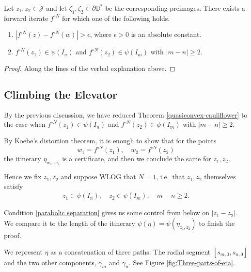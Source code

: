 \begin{theorem}
	Let $z_1,z_2 \in \mathcal J$ and let $\zeta_1,\zeta_2\in \partial \mathbb D^*$ be the corresponding preimages. 
	 There exists a forward iterate	$f^{\circ N}$ for which one of the following holds.
	\begin{enumerate}[label=(\roman*)]
		\item $\left|f^{\circ N}(z)-f^{\circ N}(w)\right|>\epsilon$, where $\epsilon>0$ is an absolute constant.
		
		\item $f^{\circ N }(z_1) \in \psi(I_n)$ and $f^{\circ N }(z_2) \in \psi(I_m)$ with $|m-n| \geq 2$.
	\end{enumerate}
	
\end{theorem}

\begin{proof}
	Along the lines of the verbal explanation above.
\end{proof}

\subsection{Climbing the Elevator}
By the previous discussion, we have reduced Theorem \ref{quasiconvex-cauliflower} to the case when $f^{\circ N }(z_1) \in \psi(I_n)$ and $f^{\circ N}(z_2) \in \psi(I_m)$ with $|m-n| \geq 2$.

By Koebe's distortion theorem, it is enough to show that for the points $$w_1=f^{\circ N }(z_1),\quad w_2=f^{\circ N }(z_2)$$ the itinerary $\eta_{w_1,w_2}$ is a certificate, and then we conclude the same for $z_1,z_2$. 

Hence we fix $z_1,z_2$ and suppose WLOG that $N=1$, i.e.\ that $z_1,z_2$ themselves satisfy 
\begin{align} \label{parabolic separation}
	z_1 \in \psi(I_n), \quad z_2 \in \psi(I_m), \quad m-n \geq 2.
\end{align}

Condition \ref{parabolic separation} gives us some control from below on $|z_1-z_2|$. We compare it to the length of the itinerary $\psi(\eta)=\psi(\eta_{z_1,z_2})$ to finish the proof.

 

We represent $\eta$ as a concatenation of three paths: The radial segment $[s_{m,0},s_{n,0}]$ and the two other components, $\gamma _m$ and $\gamma_n$. See Figure \ref{fig:Three-parts-of-eta}.

